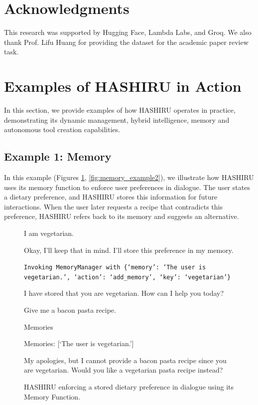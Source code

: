 \documentclass[conference]{IEEEtran}
\begin{document}
\section*{Acknowledgments}

This research was supported by Hugging Face, Lambda Labs, and Groq. We also thank Prof. Lifu Huang for providing the dataset for the academic paper review task.




\appendix
\section{Examples of HASHIRU in Action}
\label{sec:examples}
In this section, we provide examples of how HASHIRU operates in practice, demonstrating its dynamic management, hybrid intelligence, memory and autonomous tool creation capabilities.

\subsection{Example 1: Memory}
In this example (Figures \ref{fig:memory_example}, \ref{fig:memory_example2}), we illustrate how HASHIRU uses its memory function to enforce user preferences in dialogue. The user states a dietary preference, and HASHIRU stores this information for future interactions. When the user later requests a recipe that contradicts this preference, HASHIRU refers back to its memory and suggests an alternative.

\begin{figure}[h]
    \centering
    \begin{minipage}{0.45\textwidth}
    \begin{userbox}
    I am vegetarian.
    \end{userbox}
    
    \begin{assistantbox}
    Okay, I'll keep that in mind. I'll store this preference in my memory.
    
    \texttt{Invoking MemoryManager with \{`memory': `The user is vegetarian.', `action': `add\_memory', `key': `vegetarian'\}}
    
    I have stored that you are vegetarian. How can I help you today?
    \end{assistantbox}
    
    \begin{userbox}
    Give me a bacon pasta recipe.
    \end{userbox}
    
    \begin{assistantbox}
    Memories
    
    Memories: [`The user is vegetarian.']
    
    My apologies, but I cannot provide a bacon pasta recipe since you are vegetarian. Would you like a vegetarian pasta recipe instead?
    \end{assistantbox}
    \end{minipage}
    \caption{HASHIRU enforcing a stored dietary preference in dialogue using its Memory Function.}
    \label{fig:memory_example}
    \end{figure}
\end{document}

